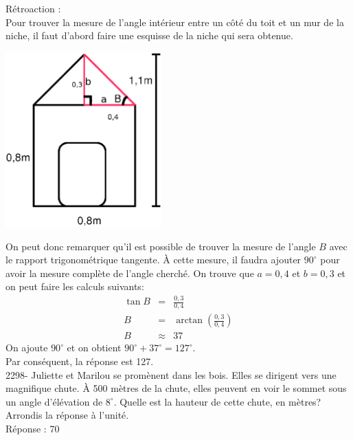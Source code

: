 \documentclass[letterpaper, 12pt]{article}
\begin{document}
R\'etroaction :\\
Pour trouver la mesure de l'angle int\'erieur entre un c\^ot\'e du toit et un mur de la niche, il faut d'abord faire une esquisse de la niche qui sera obtenue.\\
\begin{center}
 \includegraphics[width=6cm,bb=14 14 415 443]{Niche2297mesures.eps}
\end{center}
On peut donc remarquer qu'il est possible de trouver la mesure de l'angle $B$ avec le rapport trigonom\'etrique tangente. \`A cette mesure, il faudra ajouter $90^{\circ}$ pour avoir la mesure compl\`ete de l'angle cherch\'e. On trouve que $a=0,4$ et $b=0,3$ et on peut faire les calculs suivants:
\begin{eqnarray*}
\tan{B}&=&\frac{0,3}{0,4}\\[2mm]
B&=&\arctan{\left( \frac{0,3}{0,4}\right) }\\[2mm]
B&\approx&37
\end{eqnarray*}
On ajoute $90^{\circ}$ et on obtient $90^{\circ}+37^{\circ}=127^{\circ}$.\\
Par cons\'equent, la r\'eponse est 127.\\

2298- Juliette et Marilou se prom\`enent dans les bois. Elles se dirigent vers une magnifique chute. \`A 500 m\`etres de la chute, elles peuvent en voir le sommet sous un angle d'\'el\'evation de $8^{\circ}$. Quelle est la hauteur de cette chute, en m\`etres? Arrondis la r\'eponse \`a l'unit\'e.\\

R\'eponse : 70\\
\end{document}
